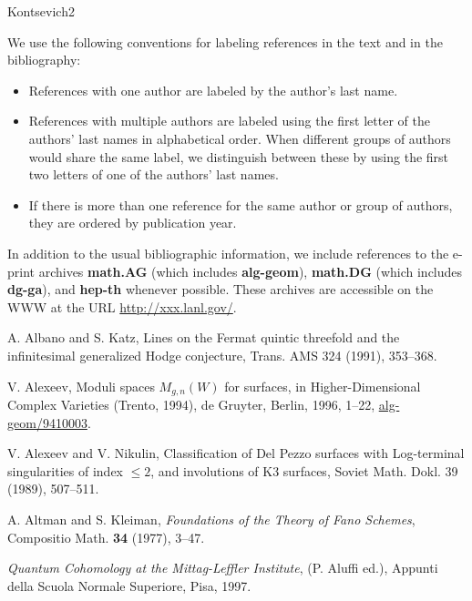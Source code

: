 \renewcommand{\bibname}{参考文献}
\begin{thebibliography}{Kontsevich2}
\item[]
We use the following conventions for labeling references in the text and in the bibliography:
\begin{itemize}
\item References with one author are labeled by the author's last name.
\item References with multiple authors are labeled using the first letter of the authors' last names in alphabetical order. When different groups of authors would share the same label, we distinguish between these by using the first two letters of one of the authors' last names.
\item If there is more than one reference for the same author or group of authors, they are ordered by publication year.
\end{itemize}
In addition to the usual bibliographic information, we include references to the e-print archives \textbf{math.AG} (which includes \textbf{alg-geom}), \textbf{math.DG} (which includes \textbf{dg-ga}), and \textbf{hep-th} whenever possible. These archives are accessible on the WWW at the URL \url{http://xxx.lanl.gov/}.


\hypertarget{bib:AKa}{}
A. Albano and S. Katz, Lines on the Fermat quintic threefold and the infinitesimal generalized Hodge conjecture, Trans. AMS 324 (1991), 353--368.

\hypertarget{bib:Alexeev}{}
V. Alexeev, Moduli spaces $M_{g,n}(W)$ for surfaces, in Higher-Dimensional Complex Varieties (Trento, 1994), de Gruyter, Berlin, 1996, 1--22, \href{https://arxiv.org/abs/alg-geom/9410003}{alg-geom/9410003}.

\hypertarget{bib:AN}{}
V. Alexeev and V. Nikulin, Classification of Del Pezzo surfaces with Log-terminal
singularities of index $\leq2$, and involutions of K3 surfaces,
Soviet Math. Dokl. 39 (1989), 507--511.

\hypertarget{bib:AKl}{} A. Altman and S. Kleiman, \emph{Foundations of the Theory of Fano Schemes}, Compositio Math. \textbf{34} (1977), 3--47.

\hypertarget{bib:Aluffi}{} \emph{Quantum Cohomology at the Mittag-Leffler Institute}, (P. Aluffi ed.), Appunti della Scuola Normale Superiore, Pisa, 1997.


\end{thebibliography}
